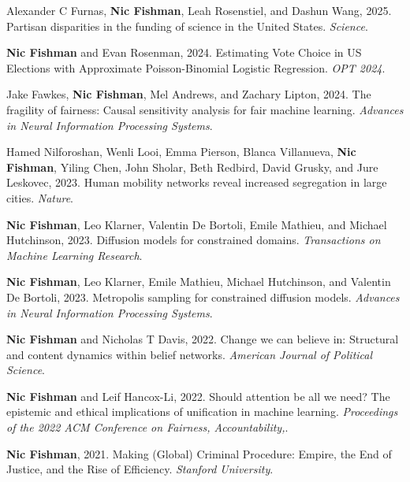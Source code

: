 \begin{cvparagraph}


\begin{addmargin}[2em]{0em}

Alexander C Furnas, \textbf{Nic Fishman}, Leah Rosenstiel, and Dashun Wang, 2025. Partisan disparities in the funding of science in the United States. \textit{Science}.

\textbf{Nic Fishman} and Evan Rosenman, 2024. Estimating Vote Choice in US Elections with Approximate Poisson-Binomial Logistic Regression. \textit{OPT 2024}.

Jake Fawkes, \textbf{Nic Fishman}, Mel Andrews, and Zachary Lipton, 2024. The fragility of fairness: Causal sensitivity analysis for fair machine learning. \textit{Advances in Neural Information Processing Systems}.

Hamed Nilforoshan, Wenli Looi, Emma Pierson, Blanca Villanueva, \textbf{Nic Fishman}, Yiling Chen, John Sholar, Beth Redbird, David Grusky, and Jure Leskovec, 2023. Human mobility networks reveal increased segregation in large cities. \textit{Nature}.

\textbf{Nic Fishman}, Leo Klarner, Valentin De Bortoli, Emile Mathieu, and Michael Hutchinson, 2023. Diffusion models for constrained domains. \textit{Transactions on Machine Learning Research}.

\textbf{Nic Fishman}, Leo Klarner, Emile Mathieu, Michael Hutchinson, and Valentin De Bortoli, 2023. Metropolis sampling for constrained diffusion models. \textit{Advances in Neural Information Processing Systems}.

\textbf{Nic Fishman} and Nicholas T Davis, 2022. Change we can believe in: Structural and content dynamics within belief networks. \textit{American Journal of Political Science}.

\textbf{Nic Fishman} and Leif Hancox-Li, 2022. Should attention be all we need? The epistemic and ethical implications of unification in machine learning. \textit{Proceedings of the 2022 ACM Conference on Fairness, Accountability,}.

\textbf{Nic Fishman}, 2021. Making (Global) Criminal Procedure: Empire, the End of Justice, and the Rise of Efficiency. \textit{Stanford University}.


\end{addmargin}
\end{cvparagraph}
